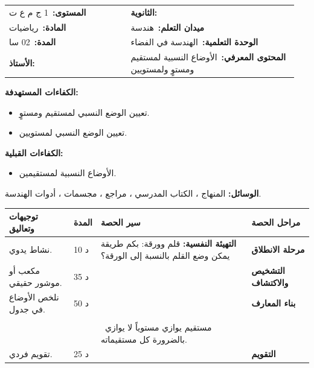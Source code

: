 \documentclass[12pt,a4paper]{article}
\makeatletter
\newenvironment{LTR}{\begin{otherlanguage}{english}}{\end{otherlanguage}}
\newcommand{\ar}[1]{\foreignlanguage{arabic}{#1}}
\newcommand{\Phase}[1]{\textbf{#1}}
\newcommand{\Fld}[2]{\textbf{#1:}\ #2}
\newcommand{\ModhHead}[9]{%
\begin{LTR}
\begin{tcolorbox}[enhanced,colback=white,colframe=cThm!85!black,arc=4mm,boxrule=1pt,top=14pt,bottom=6pt,left=8pt,right=8pt,
 overlay={\node[fill=cThm!85!black,text=white,rounded corners=3mm,inner xsep=14pt,inner ysep=4pt,font=\large\bfseries] at ([yshift=0pt]frame.north){\ar{مذكرة رقم #1}};},
 before upper={\selectlanguage{arabic}}]
\begin{tabular}{@{}p{0.4\linewidth}p{0.55\linewidth}@{}}
\Fld{المستوى}{#2} & \Fld{الثانوية}{\dotfill}\\[3pt]
\Fld{المادة}{رياضيات} & \Fld{ميدان التعلم}{#3}\\[3pt]
\Fld{المدة}{#5} & \Fld{الوحدة التعلمية}{#4}\\[3pt]
\Fld{الأستاذ}{\dotfill} & \Fld{المحتوى المعرفي}{#6}\\
\end{tabular}
\end{tcolorbox}
\begin{tcolorbox}[enhanced,colback=white,colframe=cThm!85!black,arc=3mm,boxrule=0.8pt,sidebyside,sidebyside align=top,lefthand ratio=0.5,
 segmentation style={dashed,cThm!60},before upper={\selectlanguage{arabic}},before lower={\selectlanguage{arabic}}]
\textbf{الكفاءات المستهدفة:}\par #8
\tcblower
\textbf{الكفاءات القبلية:}\par #7
\end{tcolorbox}
\end{LTR}
\par\smallskip\textbf{الوسائل:} #9\par\smallskip}
\newenvironment{Sayr}{%
\begin{LTR}\renewcommand{\arraystretch}{1.25}
\begin{longtable}{|p{0.17\textwidth}|>{\centering\arraybackslash}p{0.06\textwidth}|p{0.53\textwidth}|>{\centering\arraybackslash}p{0.12\textwidth}|}
\hline\rowcolor{cThm!12}\ar{\textbf{توجيهات وتعاليق}} & \ar{\textbf{المدة}} & \ar{\textbf{سير الحصة}} & \ar{\textbf{مراحل الحصة}}\\\hline\endhead
\hline\endfoot}{\end{longtable}\end{LTR}}
\newcommand{\Row}[4]{\ar{\small #4} & \ar{#3} & \ar{#2} & \cellcolor{cThm!8}\ar{\Phase{#1}}\\\hline}
\newcommand{\Lab}[2]{\foreignlanguage{english}{\tcbox[on line,colback=#1,colframe=#1,boxrule=0pt,arc=2pt,boxsep=1pt,left=5pt,right=5pt,top=1pt,bottom=1pt]{\ar{\textcolor{white}{\textbf{#2}}}}}}
\newcommand{\Num}[1]{\foreignlanguage{english}{\tikz[baseline=(c.base)]\node[fill=cDef,text=white,inner sep=2pt,font=\footnotesize\bfseries](c){#1};}}
\newcommand{\ck}{\ensuremath{{\color{cRem}\checkmark}}}
\makeatother
\begin{document}
\newpage
\ModhHead{46}{1 ج م ع ت}{هندسة}{الهندسة في الفضاء}{02 سا}{الأوضاع النسبية لمستقيم ومستوٍ ولمستويين}%
{\begin{itemize}\item الأوضاع النسبية لمستقيمين.\end{itemize}}%
{\begin{itemize}\item تعيين الوضع النسبي لمستقيم ومستوٍ.\item تعيين الوضع النسبي لمستويين.\end{itemize}}%
{المنهاج ، الكتاب المدرسي ، مراجع ، مجسمات ، أدوات الهندسة.}
\begin{Sayr}
\Row{مرحلة الانطلاق}{%
\textbf{التهيئة النفسية:} قلم وورقة: بكم طريقة يمكن وضع القلم بالنسبة إلى الورقة؟}{10 د}{نشاط يدوي.}
\Row{التشخيص والاكتشاف}{%
\Lab{cEx}{مناقشة النشاطين 06 و 07 صفحة 183}\par\ck\ المستقيم $(AB)$ محتوى في المستوي $(BCGF)$ ؟ لا ، يقطعه في $B$.\par
\ck\ $(EH)$ يوازي المستوي $(ABCD)$ لأنه يوازي $(AD)$ المحتوى فيه.\par
\ck\ في الموشور: مستويان متوازيان (القاعدتان) ومستويان متقاطعان في مستقيم.\par
}{35 د}{مكعب أو موشور حقيقي.}
\Row{بناء المعارف}{%
\Lab{cThm}{مستقيم ومستوٍ}\ المستقيم إما محتوى في المستوي ، أو يوازيه تماماً ، أو يقطعه في نقطة وحيدة.\par\Lab{cThm}{مستويان}\ إما متوازيان (تماماً أو منطبقان) ، وإما متقاطعان وفق مستقيم.\par}{50 د}{نلخص الأوضاع في جدول.}
\Row{}{%
\Lab{cEx}{مثال}\ في المكعب: $(ABCD)\parallel(EFGH)$ ؛ $(ABFE)\cap(BCGF)=(BF)$ ؛ $(AE)$ يقطع $(ABCD)$ في $A$.\par\Lab{cMeth}{طريقة}\ لإثبات أن مستقيماً يوازي مستوياً يكفي أن يوازي مستقيماً من هذا المستوي.\par}{}{}
\Row{}{%
\Lab{cThm!80!black}{حذار}\ مستقيم يوازي مستوياً لا يوازي بالضرورة كل مستقيماته.}{}{}
\Row{التقويم}{%
\Lab{cEx}{تطبيق}\par في المكعب: \Num{1} وضع $(FG)$ و $(ADHE)$ ؛ \Num{2} تقاطع $(ACGE)$ و $(BDHF)$.\par\textbf{الحل:} \Num{1} $(FG)\parallel(EH)$ إذن $(FG)$ يوازي المستوي ؛ \Num{2} المستقيم الذي يشمل مركزي الوجهين $ABCD$ و $EFGH$.\par\textbf{واجب منزلي:} تمارين من الكتاب المدرسي.\par\smallskip\textbf{ملاحظات حول سير الحصة:} \dotfill}{25 د}{تقويم فردي.}
\end{Sayr}
\newpage
{}%
\end{document}
